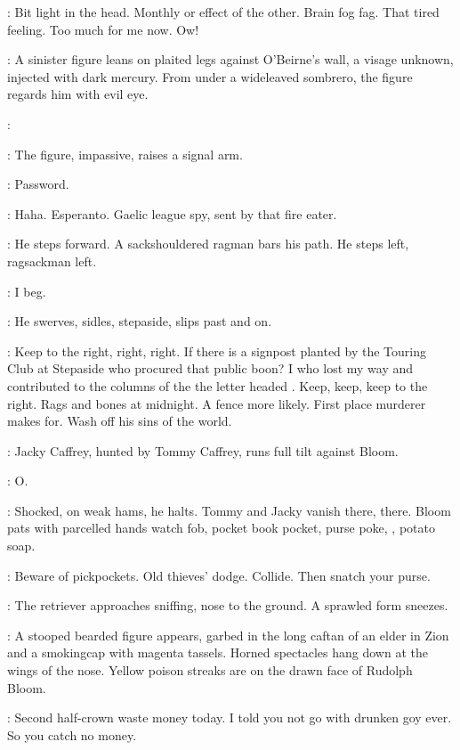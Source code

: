 \Bloom:
Bit light in the head.
Monthly or effect of the other.
Brain fog fag.
That tired feeling.
Too much for me now.
Ow!

:
A sinister figure leans on plaited legs against O'Beirne's wall,
a visage unknown,
injected with dark mercury.
From under a wideleaved sombrero,
the figure regards him with evil eye.

\Bloom:

:
The figure,
impassive,
raises a signal arm.

\Figure:
Password.

\Bloom:
Haha.
Esperanto.
Gaelic league spy,
sent by that fire eater.

:
He steps forward.
A sackshouldered ragman bars his path.
He steps left,
ragsackman left.

\Bloom:
I beg.

:
He swerves,
sidles,
stepaside,
slips past and on.

\Bloom:
Keep to the right,
right,
right.
If there is a signpost planted by the Touring Club at Stepaside
who procured that public boon?
I who lost my way and contributed to the columns of the 
the letter headed .
Keep,
keep,
keep to the right.
Rags and bones at midnight.
A fence more likely.
First place murderer makes for.
Wash off his sins of the world.

:
Jacky Caffrey,
hunted by Tommy Caffrey,
runs full tilt against Bloom.

\Bloom:
O.

:
Shocked,
on weak hams,
he halts.
Tommy and Jacky vanish there,
there.
Bloom pats with parcelled hands watch fob,
pocket book pocket,
purse poke,
,
potato soap.

\Bloom:
Beware of pickpockets.
Old thieves' dodge.
Collide.
Then snatch your purse.

:
The retriever approaches sniffing,
nose to the ground.
A sprawled form sneezes.

:
A stooped bearded figure appears,
garbed in the long caftan of an elder in Zion
and a smokingcap with magenta tassels.
Horned spectacles hang down at the wings of the nose.
Yellow poison streaks are on the drawn face of Rudolph Bloom.

\Rudolph:
Second half-crown waste money today.
I told you not go with drunken goy ever.
So you catch no money.

